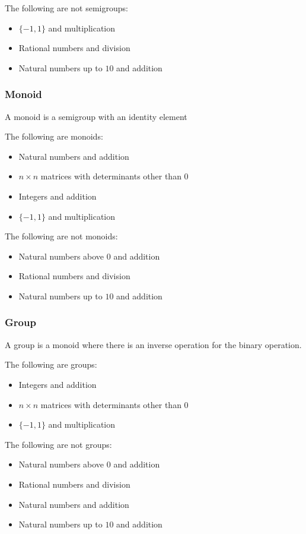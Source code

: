 The following are not semigroups:

\begin{itemize}
\item \(\{-1, 1\}\) and multiplication
\item Rational numbers and division
\item Natural numbers up to \(10\) and addition
\end{itemize}

\subsubsection{Monoid}

A monoid is a semigroup with an identity element

The following are monoids:

\begin{itemize}
\item Natural numbers and addition
\item \(n\times n\) matrices with determinants other than \(0\)
\item Integers and addition
\item \(\{-1, 1\}\) and multiplication
\end{itemize}

The following are not monoids:

\begin{itemize}
\item Natural numbers above \(0\) and addition
\item Rational numbers and division
\item Natural numbers up to \(10\) and addition
\end{itemize}

\subsubsection{Group}

A group is a monoid where there is an inverse operation for the binary operation.

The following are groups:

\begin{itemize}
\item Integers and addition
\item \(n\times n\) matrices with determinants other than \(0\)
\item \(\{-1, 1\}\) and multiplication
\end{itemize}

The following are not groups:

\begin{itemize}
\item Natural numbers above \(0\) and addition
\item Rational numbers and division
\item Natural numbers and addition
\item Natural numbers up to \(10\) and addition
\end{itemize}

